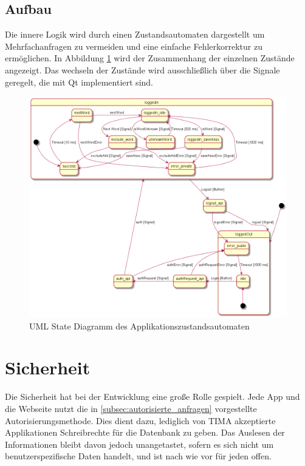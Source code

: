 \subsection{Aufbau}
Die innere Logik wird durch einen Zustandsautomaten dargestellt um
Mehrfachanfragen zu vermeiden und eine einfache Fehlerkorrektur zu ermöglichen.
In Abbildung \ref{fig:uml_automata} wird der Zusammenhang der einzelnen
Zustände angezeigt. Das wechseln der Zustände wird ausschließlich über die
Signale geregelt, die mit Qt implementiert sind.
\begin{figure}[!h]
	\centering
	\includegraphics[width=\textwidth]{../UML/app_automata.png}
	\caption{UML State Diagramm des Applikationszustandsautomaten}
	\label{fig:uml_automata}
\end{figure}

\section{Sicherheit}
Die Sicherheit hat bei der Entwicklung eine große Rolle gespielt. Jede App und die Webseite nutzt die in \ref{subsec:autorisierte_anfragen} vorgestellte Autorisierungsmethode.  Dies dient dazu, lediglich von TIMA
akzeptierte Applikationen Schreibrechte für die Datenbank zu geben.  Das Auslesen
der Informationen bleibt davon jedoch unangetastet, sofern es sich nicht um benutzerspezifische Daten handelt, und ist nach wie vor für
jeden offen.
